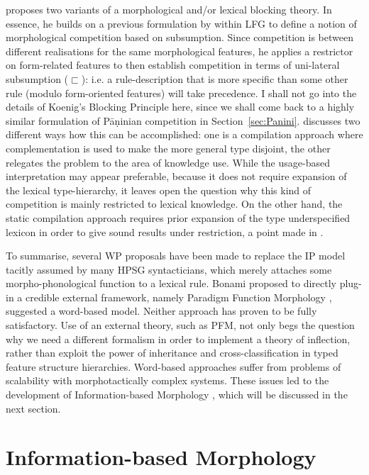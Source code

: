 \citet{Koenig99} proposes two variants of a morphological and/or lexical blocking
theory. In essence, he builds on a previous formulation by
\citet{Andrews90} within LFG to define a notion of morphological
competition based on subsumption. Since competition is between
different realisations for the same morphological features, he applies
a restrictor on form-related features to then establish competition in
terms of uni-lateral subsumption ($\sqsubset$): i.e. a
rule-description that is more specific than some other rule (modulo
form-oriented features) will take precedence. I shall not go into the
details of Koenig's Blocking Principle here, since we shall come back
to a highly similar formulation of Pāṇinian competition in
Section~\ref{sec:Panini}.  \citet{Koenig99} discusses two different
ways how this can be accomplished: one is a compilation approach where
complementation is used to make the more general type disjoint, the
other relegates the problem to the area of knowledge use. While the
usage-based interpretation may appear preferable, because it does not
require expansion of the lexical type-hierarchy, it leaves open the
question why this kind of competition is mainly restricted to lexical
knowledge. On the other hand, the static compilation approach requires
prior expansion of the type underspecified lexicon in order to give
sound results under restriction, a point made in
\citet{crysmann_b03book}.

\bigskip\noindent To summarise, several WP proposals have been made to
replace the IP model tacitly assumed by many HPSG syntacticians, which
merely attaches some morpho-phonological function to a lexical rule.
Bonami \citep{Bonami08f,Bonami06,Bonami07e,Bonami11f} proposed to
directly plug-in a credible external framework, namely Paradigm
Function Morphology \citep{Stump01}, \citet{Koenig99} suggested a
word-based model. Neither approach has proven to be fully
satisfactory. Use of an external theory, such as PFM, not only begs
the question why we need a different formalism in order to implement a
theory of inflection, rather than exploit the power of inheritance and
cross-classification in typed feature structure
hierarchies. Word-based approaches suffer from problems of scalability
with morphotactically complex systems.  These issues led to the
development of Information-based Morphology
\citep{Crysmann:Bonami:2016}, which will be discussed in the next
section.


\section{Information-based Morphology}
\label{sec:IbM}

